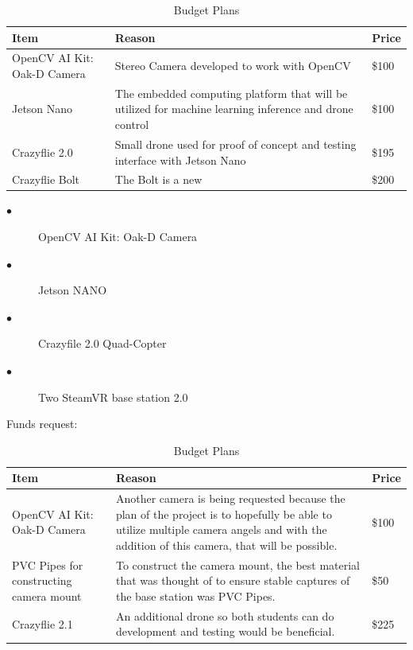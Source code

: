 \documentclass[12pt,onecolumn]{IEEEtran}			%
\begin{document}
\begin{table}[h!]
\begin{center}
\begin{tabular}{| m{3cm} | m{13cm}| m{1cm} |} 
 \hline
  Item & Reason  & Price \\
 \hline
 OpenCV AI Kit: Oak-D Camera & Stereo Camera developed to work with OpenCV  & \$100 \\
 \hline
 Jetson Nano & The embedded computing platform that will be utilized for machine learning inference and drone control  & \$100 \\
 \hline
 Crazyflie 2.0 & Small drone used for proof of concept and testing interface with Jetson Nano & \$195 \\
 \hline
 Crazyflie Bolt & The Bolt is a new & \$200 \\
 \hline
\end{tabular}
\end{center}
\caption{Budget Plans}
\label{Budget Table:2}
\end{table}

 \begin{description}
  \item[$\bullet$ ] OpenCV AI Kit: Oak-D Camera
  \item[$\bullet$ ] Jetson NANO
  \item[$\bullet$ ] Crazyfile 2.0 Quad-Copter
  \item[$\bullet$ ] Two SteamVR base station 2.0
\end{description}

\vspace{12pt} 

Funds request:

 \begin{table}[h!]
\begin{center}
\begin{tabular}{| m{3cm} | m{13cm}| m{1cm} |} 
 \hline
  Item & Reason  & Price \\
 \hline
 OpenCV AI Kit: Oak-D Camera & Another camera is being requested because the plan of the project is to hopefully be able to utilize multiple camera angels and with the addition of this camera, that will be possible.  & \$100 \\
 \hline
 PVC Pipes for constructing camera mount & To construct the camera mount, the best material that was thought of to ensure stable captures of the base station was PVC Pipes. & \$50 \\
 \hline
 Crazyflie 2.1 & An additional drone so both students can do development and testing would be beneficial. & \$225 \\
 \hline
\end{tabular}
\end{center}
\caption{Budget Plans}
\label{Budget Table:2}
\end{table}
\vspace{12pt} 
 
\end{document}
